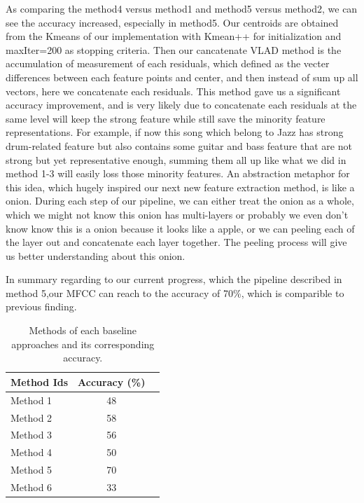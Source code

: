 \documentclass[final]{siamltexmm}
\begin{document}
As comparing the method4 versus method1 and method5 versus method2, we can see the accuracy increased, especially in method5. Our centroids are obtained from the Kmeans of our implementation with Kmean++ for initialization and maxIter=200 as stopping criteria. Then our cancatenate VLAD method is the accumulation of measurement of each residuals, which defined as the vecter differences between each feature points and center, and then instead of sum up all vectors, here we concatenate each residuals. This method gave us a significant accuracy improvement, and is very likely due to concatenate each residuals at the same level will keep the strong feature while still save the minority feature representations. For example, if now this song which belong to Jazz has strong drum-related feature but also contains some guitar and bass feature that are not strong but yet representative enough, summing them all up like what we did in method 1-3 will easily loss those minority features. An abstraction metaphor for this idea, which hugely inspired our next new feature extraction method, is like a onion. During each step of our pipeline, we can either treat the onion as a whole, which we might not know this onion has multi-layers or probably we even don't know know this is a onion because it looks like a apple, or we can peeling each of the layer out and concatenate each layer together. The peeling process will give us better understanding about this onion.

In summary regarding to our current progress, which the pipeline described in method 5,our MFCC can reach to the accuracy of 70\%, which is comparible to previous finding.

\begin{table}[h!]
\centering
  \begin{tabular}{ l || c | r }
    \hline
    Method Ids & Accuracy (\%) \\ \hline \hline
    Method 1 & 48 \\ \hline
    Method 2 & 58 \\ \hline
    Method 3 & 56 \\ \hline
    Method 4 & 50 \\ \hline
    Method 5 & 70 \\ \hline
    Method 6 & 33 \\ \hline
    \hline
  \end{tabular}
\caption{Methods of each baseline approaches and its corresponding accuracy.}
\label{table:1}
\end{table}
\end{document}
